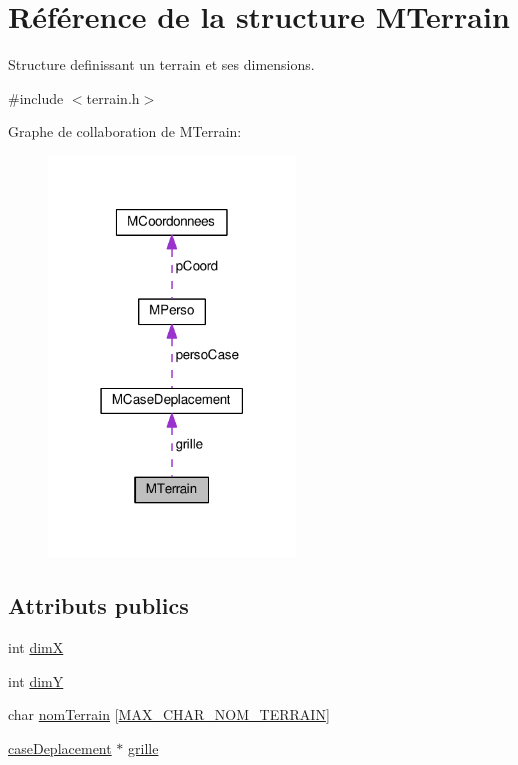 \hypertarget{structMTerrain}{}\section{Référence de la structure M\+Terrain}
\label{structMTerrain}


Structure definissant un terrain et ses dimensions.  




{\ttfamily \#include $<$terrain.\+h$>$}



Graphe de collaboration de M\+Terrain\+:\nopagebreak
\begin{figure}[H]
\begin{center}
\leavevmode
\includegraphics[width=186pt]{structMTerrain__coll__graph}
\end{center}
\end{figure}
\subsection*{Attributs publics}
\begin{DoxyCompactItemize}
\item 
int \hyperlink{structMTerrain_ae6f66d485448ae93c427e0586d6b12aa}{dimX}
\item 
int \hyperlink{structMTerrain_a638d309791fdf84d0267d75702bbab50}{dimY}
\item 
char \hyperlink{structMTerrain_a948d5d38016eed56187a94028e34f5e4}{nom\+Terrain} \mbox{[}\hyperlink{terrain_8h_a5f41c70ea486e890717560da2605f309}{M\+A\+X\+\_\+\+C\+H\+A\+R\+\_\+\+N\+O\+M\+\_\+\+T\+E\+R\+R\+A\+IN}\mbox{]}
\item 
\hyperlink{caseDeplacement_8h_aeab4f22b99f0db8b549dab4e46e3ead4}{case\+Deplacement} $\ast$ \hyperlink{structMTerrain_a392b4ed453bab400087d0bda7d452877}{grille}
\end{DoxyCompactItemize}


